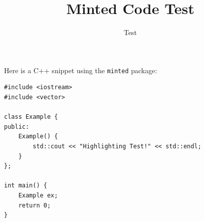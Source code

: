 \documentclass{article}
\title{Minted Code Test}
\author{Test}
\begin{document}
Here is a C++ snippet using the \texttt{minted} package:

\begin{verbatim}
#include <iostream>
#include <vector>

class Example {
public:
    Example() {
        std::cout << "Highlighting Test!" << std::endl;
    }
};

int main() {
    Example ex;
    return 0;
}
\end{verbatim}
\end{document}
